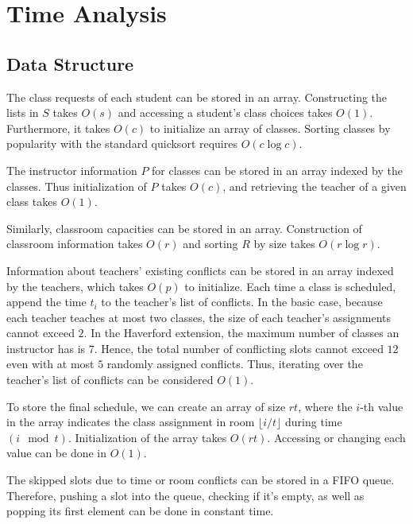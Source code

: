 \documentclass[11pt, oneside]{article}   	%
\begin{document}
\section{Time Analysis}
\subsection{Data Structure}
The class requests of each student can be stored in an array. Constructing the lists in $S$ takes $O(s)$ and accessing a student's class choices takes $O(1)$. Furthermore, it takes $O(c)$ to initialize an array of classes. Sorting classes by popularity with the standard quicksort requires $O(c\log c)$.\par
The instructor information $P$ for classes can be stored in an array indexed by the classes. Thus initialization of $P$ takes $O(c)$, and retrieving the teacher of a given class takes $O(1)$.
\par Similarly, classroom capacities can be stored in an array. Construction of classroom information takes $O(r)$ and sorting $R$ by size takes $O(r\log r)$.\par
Information about teachers' existing conflicts can be stored in an array indexed by the teachers, which takes $O(p)$ to initialize. Each time a class is scheduled, append the time $t_i$ to the teacher's list of conflicts. In the basic case, because each teacher teaches at most two classes, the size of each teacher's assignments cannot exceed $2$. In the Haverford extension, the maximum number of classes an instructor has is $7$. Hence, the total number of conflicting slots cannot exceed $12$ even with at most $5$ randomly assigned conflicts. Thus, iterating over the teacher's list of conflicts can be considered $O(1)$.\par
To store the final schedule, we can create an array of size $rt$, where the $i$-th value in the array indicates the class assignment in room $\lfloor i / t\rfloor$ during time $(i\mod t)$. Initialization of the array takes $O(rt)$. Accessing or changing each value can be done in $O(1)$.\par
The skipped slots due to time or room conflicts can be stored in a FIFO queue. Therefore, pushing a slot into the queue, checking if it's empty, as well as popping its first element can be done in constant time.\par
\end{document}
